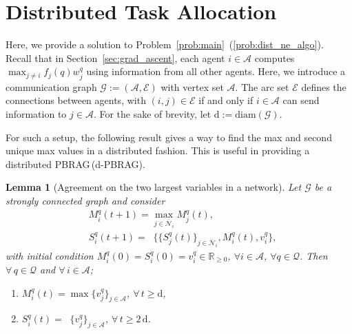 \documentclass{IEEEtran}
\newcommand{\ldef}{:=}
\newcommand{\Mcal}[1]{\mathcal{#1}}
\newcommand{\Mc}[1]{\mathcal{#1}}
\newtheorem{lemma}[theorem]{Lemma}
\newcommand{\real}{\ensuremath{\mathbb{R}}}
\renewcommand{\bar}[1]{\overline{#1}}
\newcommand{\marginn}[1]{\marginpar{\color{blue}\tiny\ttfamily#1}}
\newcommand{\margin}[1]{\marginpar{\color{magenta}\tiny\ttfamily#1}}
\def \agt{\Mcal{A}}
\def \diam{\mathrm{diam}}
\def \dg{\mathrm{d}}
\def \edg{\Mcal{E}}
\def \grph{\Mcal{G}}
\def \neighb{\bar{\Mc{N}}}
\def \real{\mathbb{R}}
\def \tsk{\Mc{Q}}
\DeclareMathOperator*{\submax}{max^{(2)}}
\def \dynacr{PBRAG}
\begin{document}
\section{Distributed Task Allocation} \label{sec:distributed_dyn}

Here, we provide a solution to
Problem~\ref{prob:main}~(\ref{prob:dist_ne_algo}). Recall that in
Section~\ref{sec:grad_ascent}, each agent $i \in \agt$ computes
$\max_{j \neq i}f_j(q)w^q_j$ using information from all other agents.
Here, we introduce a communication graph $\grph \ldef (\agt,\edg)$
with vertex set $\agt$. The arc set $\edg$ defines the connections
between agents, with $(i,j) \in \edg$ if and only if $i \in \agt$ can
send information to $j \in \agt$. For the sake of brevity, let
$\dg \ldef \diam(\grph)$.

For such a setup, the following result gives a way to find the max and
second unique max values in a distributed fashion. This is useful in
providing a distributed \dynacr\,(d-\dynacr).  
\begin{lemma}[Agreement on the two largest variables in a network]
  \label{lem:max_consensus} 
Let $\grph$ be a
strongly connected graph and consider
\begin{subequations}
\begin{align}
	\label{eq:max_consensus_no_switch} & M^q_i(t+1) = \max_{j \in \neighb_i} M^q_j(t),\\
	\label{eq:submax_consensus_no_switch} & S^q_i(t+1) = \submax \Big\{\{S^q_j(t)\}_{j \in \neighb_i},M^q_i(t),v^q_i \Big\},
\end{align}
\label{eq:consensus_no_switch}
\end{subequations}
with initial condition $M^q_i(0) = S^q_i(0) = v^q_i \in \real_{\geq 0}$, $\forall i \in \agt$, $\forall q \in \tsk$. Then $\forall \, q \in \tsk$ and $ \forall \, i \in \agt$;
\begin{enumerate}
	\item \label{prop:max_converge} $M^q_i (t) = \max \{v^q_j\}_{j \in \agt}$, $\forall \, t \geq \dg$,
	\item \label{prop:submax_converge} $S^q_i (t) = \submax \{v^q_j\}_{j \in \agt}$, $\forall \, t \geq 2\,\dg$.
\end{enumerate}
\end{lemma}
\end{document}
